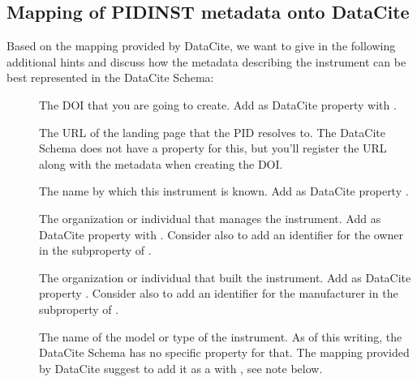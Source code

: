 \documentclass[a4paper,10pt,english]{sphinxmanual}
\begin{document}
\subsection{Mapping of PIDINST metadata onto DataCite}
\label{\detokenize{datacite-cookbook/metadata:mapping-of-pidinst-metadata-onto-datacite}}
\sphinxAtStartPar
Based on the mapping provided by DataCite, we want to give in the
following additional hints and discuss how the metadata describing the
instrument can be best represented in the DataCite Schema:
\begin{description}
\item[{}] \leavevmode
\sphinxAtStartPar
The DOI that you are going to create.  Add as DataCite property
 with .

\item[{}] \leavevmode
\sphinxAtStartPar
The URL of the landing page that the PID resolves to.  The DataCite
Schema does not have a property for this, but you’ll register the
URL along with the metadata when creating the DOI.

\item[{}] \leavevmode
\sphinxAtStartPar
The name by which this instrument is known.  Add as DataCite property
.

\item[{}] \leavevmode
\sphinxAtStartPar
The organization or individual that manages the instrument.  Add as
DataCite property  with
.  Consider also to add an
identifier for the owner in the  subproperty of
.

\item[{}] \leavevmode
\sphinxAtStartPar
The organization or individual that built the instrument.  Add as
DataCite property .  Consider also to add an identifier for
the manufacturer in the  subproperty of .

\item[{}] \leavevmode
\sphinxAtStartPar
The name of the model or type of the instrument.  As of this
writing, the DataCite Schema has no specific property for that.  The
mapping provided by DataCite suggest to add it as a 
with , see note below.


\end{description}
\end{document}
